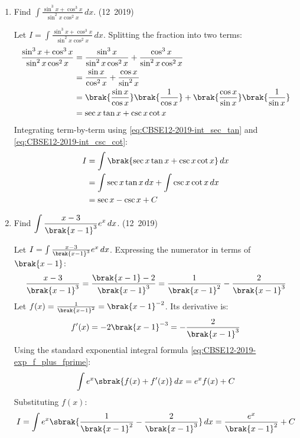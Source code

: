 \begin{enumerate}[label=\thesubsection.\arabic*, ref=\thesubsection.\theenumi]
\item Find $\displaystyle\int \frac{\sin^3 x + \cos^3 x}{\sin^2 x \cos^2 x}\,dx$.
\hfill (12~2019)

\solution
Let $I = \int \frac{\sin^3 x + \cos^3 x}{\sin^2 x \cos^2 x}\,dx$.
Splitting the fraction into two terms:
\begin{align}
	\frac{\sin^3 x + \cos^3 x}{\sin^2 x \cos^2 x} &= \frac{\sin^3 x}{\sin^2 x \cos^2 x} + \frac{\cos^3 x}{\sin^2 x \cos^2 x} \\
	&= \frac{\sin x}{\cos^2 x} + \frac{\cos x}{\sin^2 x} \\
	&= \brak{\frac{\sin x}{\cos x}}\brak{\frac{1}{\cos x}} + \brak{\frac{\cos x}{\sin x}}\brak{\frac{1}{\sin x}} \\
	&= \sec x \tan x + \csc x \cot x
\end{align}
Integrating term-by-term using \eqref{eq:CBSE12-2019-int_sec_tan} and \eqref{eq:CBSE12-2019-int_csc_cot}:
\begin{align}
	I &= \int \brak{\sec x \tan x + \csc x \cot x}\,dx \\
	&= \int \sec x \tan x\,dx + \int \csc x \cot x\,dx \\
	&= \sec x - \csc x + C
\end{align}


\item Find $\displaystyle\int \frac{x - 3}{\brak{x - 1}^3} e^x\,dx$.
\hfill (12~2019)

\solution
Let $I = \int \frac{x - 3}{\brak{x - 1}^3} e^x\,dx$.
Expressing the numerator in terms of $\brak{x - 1}$:
\begin{align}
	\frac{x - 3}{\brak{x - 1}^3} = \frac{\brak{x - 1} - 2}{\brak{x - 1}^3} = \frac{1}{\brak{x - 1}^2} - \frac{2}{\brak{x - 1}^3}
\end{align}
Let $f(x) = \frac{1}{\brak{x - 1}^2} = \brak{x - 1}^{-2}$. Its derivative is:
\begin{align}
	f'(x) = -2\brak{x - 1}^{-3} = -\frac{2}{\brak{x - 1}^3}
\end{align}
Using the standard exponential integral formula \eqref{eq:CBSE12-2019-exp_f_plus_fprime}:
\begin{align}
	\int e^x \sbrak{f(x) + f'(x)}\,dx = e^x f(x) + C
\end{align}
Substituting $f(x)$:
\begin{align}
	I = \int e^x \sbrak{\frac{1}{\brak{x - 1}^2} - \frac{2}{\brak{x - 1}^3}}\,dx = \frac{e^x}{\brak{x - 1}^2} + C
\end{align}



\end{enumerate}
